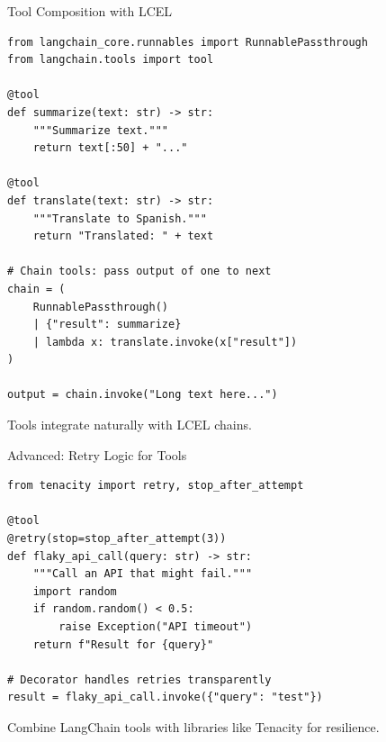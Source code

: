 \documentclass[aspectratio=169,11pt]{beamer}
\begin{document}
\begin{frame}[fragile,shrink=2]{Tool Composition with LCEL}
\begin{codebox}
\begin{lstlisting}
from langchain_core.runnables import RunnablePassthrough
from langchain.tools import tool

@tool
def summarize(text: str) -> str:
    """Summarize text."""
    return text[:50] + "..."

@tool
def translate(text: str) -> str:
    """Translate to Spanish."""
    return "Translated: " + text

# Chain tools: pass output of one to next
chain = (
    RunnablePassthrough()
    | {"result": summarize}
    | lambda x: translate.invoke(x["result"])
)

output = chain.invoke("Long text here...")
\end{lstlisting}
\end{codebox}

Tools integrate naturally with LCEL chains.
\end{frame}

\begin{frame}[fragile,shrink=2]{Advanced: Retry Logic for Tools}
\begin{codebox}
\begin{lstlisting}
from tenacity import retry, stop_after_attempt

@tool
@retry(stop=stop_after_attempt(3))
def flaky_api_call(query: str) -> str:
    """Call an API that might fail."""
    import random
    if random.random() < 0.5:
        raise Exception("API timeout")
    return f"Result for {query}"

# Decorator handles retries transparently
result = flaky_api_call.invoke({"query": "test"})
\end{lstlisting}
\end{codebox}

Combine LangChain tools with libraries like Tenacity for resilience.
\end{frame}
\end{document}
